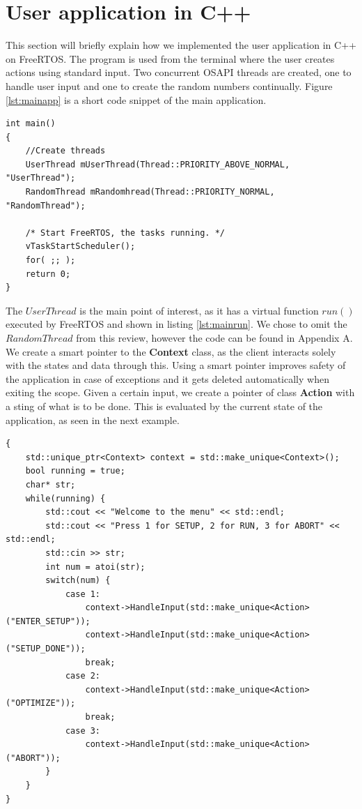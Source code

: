 \section{User application in C++}

This section will briefly explain how we implemented the user application in C++ on FreeRTOS. The program is used from the terminal where the user creates actions using standard input. Two concurrent OSAPI threads are created, one to handle user input and one to create the random numbers continually. Figure \ref{lst:mainapp} is a short code snippet of the main application.

\begin{lstlisting}[style=customc++,caption={Main application, where two threads are created and the scheduler started.},label={lst:mainapp}]
int main()
{
	//Create threads
	UserThread mUserThread(Thread::PRIORITY_ABOVE_NORMAL, "UserThread");
	RandomThread mRandomhread(Thread::PRIORITY_NORMAL, "RandomThread");

	/* Start FreeRTOS, the tasks running. */
	vTaskStartScheduler();
	for( ;; );
	return 0;
}
\end{lstlisting}

The $UserThread$ is the main point of interest, as it has a virtual function $run()$ executed by FreeRTOS and shown in listing \ref{lst:mainrun}. We chose to omit the $RandomThread$ from this review, however the code can be found in Appendix A. We create a smart pointer to the \textbf{Context} class, as the client interacts solely with the states and data through this. Using a smart pointer improves safety of the application in case of exceptions and it gets deleted automatically when exiting the scope. Given a certain input, we create a pointer of class \textbf{Action} with a sting of what is to be done. This is evaluated by the current state of the application, as seen in the next example.

\begin{lstlisting}[style=customc++,caption={Main application, where two threads are created with a scheduler.},label={lst:mainrun}]
{
	std::unique_ptr<Context> context = std::make_unique<Context>();
	bool running = true;
	char* str;
	while(running) {
		std::cout << "Welcome to the menu" << std::endl;
		std::cout << "Press 1 for SETUP, 2 for RUN, 3 for ABORT" << std::endl;
		std::cin >> str;
		int num = atoi(str);
		switch(num) {
			case 1:
				context->HandleInput(std::make_unique<Action>("ENTER_SETUP"));
				context->HandleInput(std::make_unique<Action>("SETUP_DONE"));
				break;
			case 2:
				context->HandleInput(std::make_unique<Action>("OPTIMIZE"));
				break;
			case 3:
				context->HandleInput(std::make_unique<Action>("ABORT"));
		}
	}
}
\end{lstlisting}

